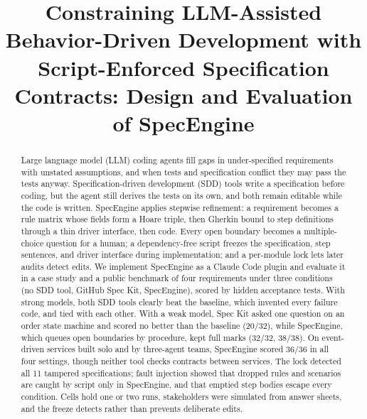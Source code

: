 \documentclass[conference]{IEEEtran}
\begin{document}
\title{Constraining LLM-Assisted Behavior-Driven Development with Script-Enforced Specification Contracts: Design and Evaluation of SpecEngine}

\author{
}

\maketitle

\begin{abstract}
Large language model (LLM) coding agents fill gaps in under-specified requirements with unstated assumptions, and when tests and specification conflict they may pass the tests anyway. Specification-driven development (SDD) tools write a specification before coding, but the agent still derives the tests on its own, and both remain editable while the code is written. SpecEngine applies stepwise refinement: a requirement becomes a rule matrix whose fields form a Hoare triple, then Gherkin bound to step definitions through a thin driver interface, then code. Every open boundary becomes a multiple-choice question for a human; a dependency-free script freezes the specification, step sentences, and driver interface during implementation; and a per-module lock lets later audits detect edits. We implement SpecEngine as a Claude Code plugin and evaluate it in a case study and a public benchmark of four requirements under three conditions (no SDD tool, GitHub Spec Kit, SpecEngine), scored by hidden acceptance tests. With strong models, both SDD tools clearly beat the baseline, which invented every failure code, and tied with each other. With a weak model, Spec Kit asked one question on an order state machine and scored no better than the baseline (20/32), while SpecEngine, which queues open boundaries by procedure, kept full marks (32/32, 38/38). On event-driven services built solo and by three-agent teams, SpecEngine scored 36/36 in all four settings, though neither tool checks contracts between services. The lock detected all 11 tampered specifications; fault injection showed that dropped rules and scenarios are caught by script only in SpecEngine, and that emptied step bodies escape every condition. Cells hold one or two runs, stakeholders were simulated from answer sheets, and the freeze detects rather than prevents deliberate edits.
\end{abstract}
\end{document}

